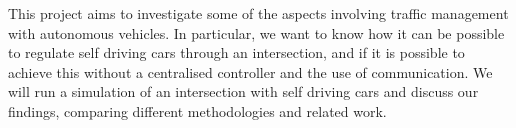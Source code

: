 This project aims to investigate some of the aspects involving traffic management with autonomous vehicles.
In particular, we want to know how it can be possible to regulate self driving cars through an intersection, and if it is possible to achieve this without a centralised controller and the use of communication.
We will run a simulation of an intersection with self driving cars and discuss our findings, comparing different methodologies and related work.